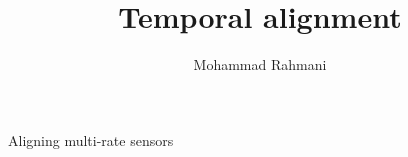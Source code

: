\documentclass[a4paper]{article}
\title{Temporal alignment}
\date{}
\author{Mohammad Rahmani}
\begin{document}
    \maketitle
    Aligning multi-rate sensors
    
    
\end{document}
